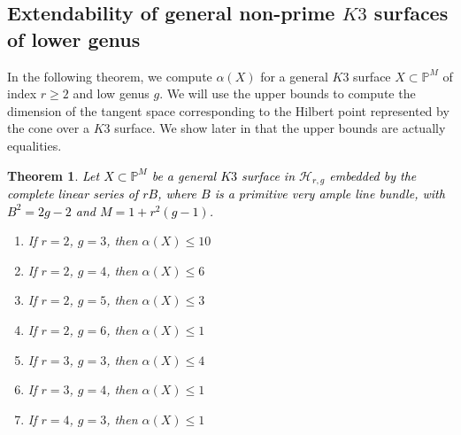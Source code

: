 \documentclass[11pt,twoside]{amsart}
\theoremstyle{plain}
\numberwithin{equation}{section}
\newtheorem{theorem}{Theorem}[section]
\theoremstyle{definition}
\begin{document}
\subsection{Extendability of general non-prime $K3$ surfaces of lower genus}

In the following theorem, we compute $\alpha(X)$ for a general $K3$ surface $X \subset \mathbb{P}^M$ of index $r \geq 2$ and low genus $g$. We will use the upper bounds to compute the dimension of the tangent space corresponding to the Hilbert point represented by the cone over a $K3$ surface. We show later in  that the upper bounds are actually equalities. 

\begin{theorem}\label{ZL for lower genus $K3$ surfaces}
\textcolor{black}{Let $X \subset \mathbb{P}^{M}$ be a general $K3$ surface in $\mathcal{H}_{r,g}$ embedded by the complete linear series of $rB$, where $B$ is a primitive very ample line bundle, with $B^2 = 2g-2$ and $M = 1+r^2(g-1)$.}
 
    \begin{enumerate}
        \item \label{2,3} If $r = 2$, $g = 3$, then $\alpha(X) \leq 10$ %
        \item \label{2,4} If $r = 2$, $g = 4$, then $\alpha(X) \leq 6$ 
        \item \label{2,5} If $r = 2$, $g = 5$, then $\alpha(X) \leq 3$ 
        \item \label{2,6} If $r = 2$, $g = 6$, then $\alpha(X) \leq 1$ 
        \item \label{3,3} If $r = 3$, $g = 3$, then $\alpha(X) \leq 4$
        \item \label{3,4} If $r = 3$, $g = 4$, then $\alpha(X) \leq 1$ 
        \item \label{4,3} If $r = 4$, $g = 3$, then $\alpha(X) \leq 1$
        
       
        
    \end{enumerate}
    
\end{theorem}
\end{document}
